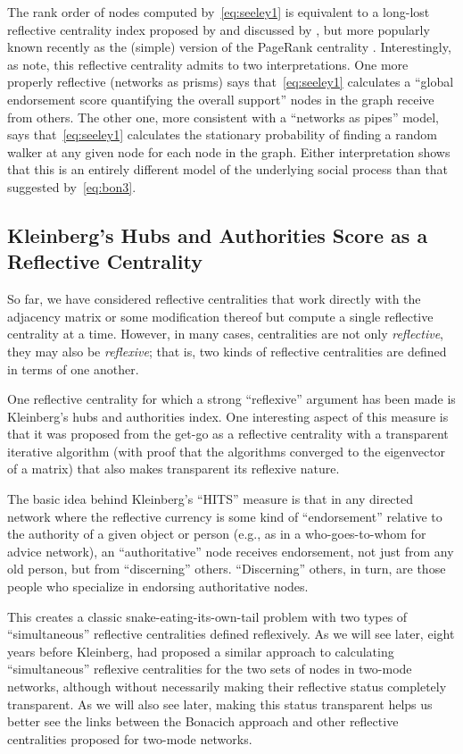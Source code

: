 \documentclass[a4paper,fleqn]{cas-sc}
\begin{document}
The rank order of nodes computed by~\ref{eq:seeley1} is equivalent to a long-lost reflective centrality index proposed by \citet{seeley49} and discussed by \citet{vigna16}, but more popularly known recently as the (simple) version of the PageRank centrality \citep{brinn_page}. Interestingly, as \citet[218]{fouss_etal16} note, this reflective centrality admits to two interpretations. One more properly reflective (networks as prisms) says that~\ref{eq:seeley1} calculates a ``global endorsement score quantifying the overall support'' nodes in the graph receive from others. The other one, more consistent with a ``networks as pipes'' model, says that~\ref{eq:seeley1} calculates the stationary probability of finding a random walker at any given node for each node in the graph. Either interpretation shows that this is an entirely different model of the underlying social process than that suggested by~\ref{eq:bon3}.

\subsection{Kleinberg's Hubs and Authorities Score as a Reflective Centrality}
So far, we have considered reflective centralities that work directly with the adjacency matrix or some modification thereof but compute a single reflective centrality at a time. However, in many cases, centralities are not only \textit{reflective}, they may also be \textit{reflexive}; that is, two kinds of reflective centralities are defined in terms of one another. 

One reflective centrality for which a strong ``reflexive'' argument has been made is Kleinberg's \citeyearpar{kleinberg99} hubs and authorities index. One interesting aspect of this measure is that it was proposed from the get-go as a reflective centrality with a transparent iterative algorithm (with proof that the algorithms converged to the eigenvector of a matrix) that also makes transparent its reflexive nature. 

The basic idea behind Kleinberg's ``HITS'' measure is that in any directed network where the reflective currency is some kind of ``endorsement'' relative to the authority of a given object or person (e.g., as in a who-goes-to-whom for advice network), an ``authoritative'' node receives endorsement, not just from any old person, but from ``discerning'' others.  ``Discerning'' others, in turn, are those people who specialize in endorsing authoritative nodes. 

This creates a classic snake-eating-its-own-tail problem with two types of ``simultaneous'' reflective centralities defined reflexively. As we will see later, eight years before Kleinberg, \citet{bonacich91} had proposed a similar approach to calculating ``simultaneous'' reflexive centralities for the two sets of nodes in two-mode networks, although without necessarily making their reflective status completely transparent. As we will also see later, making this status transparent helps us better see the links between the Bonacich approach and other reflective centralities proposed for two-mode networks. 
\end{document}
